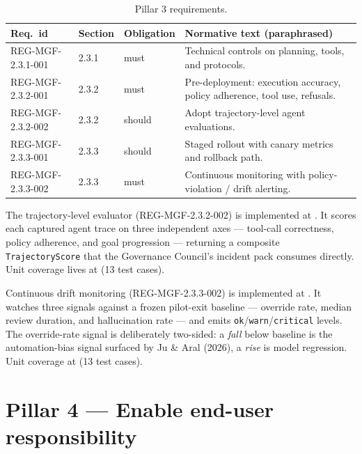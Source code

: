 \begin{table}[h]
\centering
\small
\begin{tabularx}{\textwidth}{p{3.2cm}p{1.4cm}p{1.6cm}X}
\toprule
\textbf{Req.\ id} & \textbf{Section} & \textbf{Obligation} & \textbf{Normative text (paraphrased)} \\
\midrule
REG-MGF-2.3.1-001 & 2.3.1 & must   & Technical controls on planning, tools, and protocols. \\
REG-MGF-2.3.2-001 & 2.3.2 & must   & Pre-deployment: execution accuracy, policy adherence, tool use, refusals. \\
REG-MGF-2.3.2-002 & 2.3.2 & should & Adopt trajectory-level agent evaluations. \\
REG-MGF-2.3.3-001 & 2.3.3 & should & Staged rollout with canary metrics and rollback path. \\
REG-MGF-2.3.3-002 & 2.3.3 & must   & Continuous monitoring with policy-violation / drift alerting. \\
\bottomrule
\end{tabularx}
\caption{Pillar 3 requirements.}
\label{tab:p3}
\end{table}

The trajectory-level evaluator (REG-MGF-2.3.2-002) is implemented at
.
It scores each captured agent trace on three independent axes ---
tool-call correctness, policy adherence, and goal progression ---
returning a composite \texttt{TrajectoryScore} that the Governance
Council's incident pack consumes directly. Unit coverage lives at
(13 test cases).

Continuous drift monitoring (REG-MGF-2.3.3-002) is implemented at
.
It watches three signals against a frozen pilot-exit baseline ---
override rate, median review duration, and hallucination rate --- and
emits \texttt{ok}/\texttt{warn}/\texttt{critical} levels. The
override-rate signal is deliberately two-sided: a \emph{fall} below
baseline is the automation-bias signal surfaced by Ju \& Aral (2026),
a \emph{rise} is model regression. Unit coverage at
(13 test cases).

\section{Pillar 4 --- Enable end-user responsibility}
\label{sec:mgf-p4}

